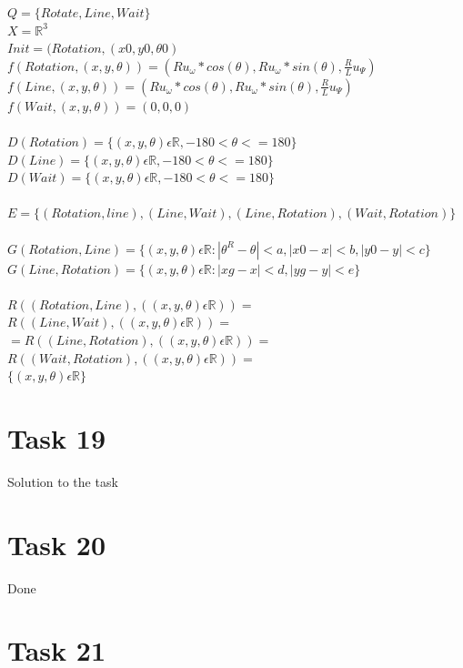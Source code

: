 \documentclass[a4paper,12pt,oneside,onecolumn]{article} %
\begin{document}
	$Q = \{Rotate,Line,Wait\}$\\
	$X = \mathbb{R}^3$\\
	$Init = (Rotation,(x0,y0,\theta0)$
	\\
	$f(Rotation,(x,y,\theta)) = (Ru_\omega*cos(\theta),Ru_\omega*sin(\theta),\frac{R}{L}u_\Psi)$\\
	$f(Line,(x,y,\theta)) = (Ru_\omega*cos(\theta),Ru_\omega*sin(\theta),\frac{R}{L}u_\Psi)$\\
	$f(Wait,(x,y,\theta)) = (0,0,0)$\\
	\\
	$D(Rotation) = \{(x,y,\theta) \epsilon \mathbb{R}, -180 < \theta <= 180\}$\\
	$D(Line) = \{(x,y,\theta) \epsilon \mathbb{R}, -180 < \theta <= 180\}$\\
	$D(Wait) = \{(x,y,\theta) \epsilon \mathbb{R}, -180 < \theta <= 180\}$\\
	\\
	$E = \{ (Rotation,line),(Line,Wait),(Line,Rotation),(Wait,Rotation)\}$\\\\
	$G(Rotation, Line) = \{(x,y,\theta) \epsilon \mathbb{R}: |\theta^R - \theta| < a, |x0 - x| < b, |y0 -y| < c\}$\\
	$G(Line, Rotation)=\{(x,y,\theta) \epsilon \mathbb{R}: |xg - x|<d,|yg -y|<e\}$\\\\	
	$R((Rotation, Line), ((x,y,\theta) \epsilon \mathbb{R}))=$ 
	$R((Line, Wait), ((x,y,\theta) \epsilon \mathbb{R}))=$\\
	$=R((Line, Rotation), ((x,y,\theta) \epsilon \mathbb{R}))=$
	$R((Wait, Rotation), ((x,y,\theta) \epsilon \mathbb{R}))=$\\$\{(x,y,\theta) \epsilon \mathbb{R}\}$\\


\section*{Task 19}

Solution to the task

\section*{Task 20}

Done

\section*{Task 21}
\end{document}
